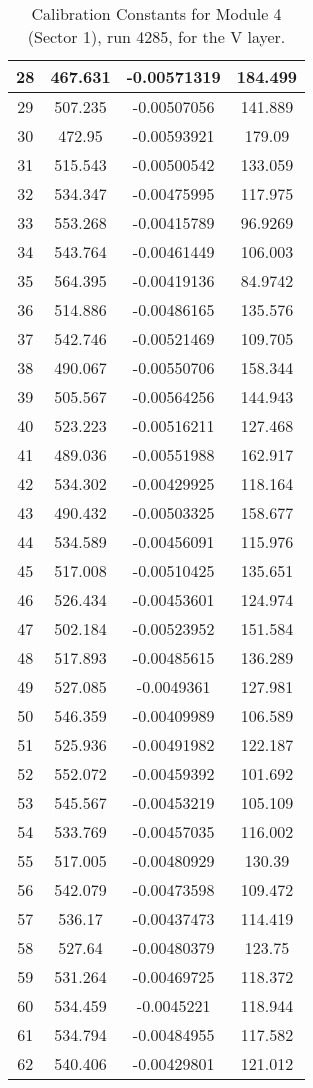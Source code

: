 \begin{table}[h]
{\begin{tabular}{|c|c|c|c|}
28	&	467.631	&	-0.00571319	&	184.499	\\	\hline
29	&	507.235	&	-0.00507056	&	141.889	\\	\hline
30	&	472.95	&	-0.00593921	&	179.09	\\	\hline
31	&	515.543	&	-0.00500542	&	133.059	\\	\hline
32	&	534.347	&	-0.00475995	&	117.975	\\	\hline
33	&	553.268	&	-0.00415789	&	96.9269	\\	\hline
34	&	543.764	&	-0.00461449	&	106.003	\\	\hline
35	&	564.395	&	-0.00419136	&	84.9742	\\	\hline
36	&	514.886	&	-0.00486165	&	135.576	\\	\hline
37	&	542.746	&	-0.00521469	&	109.705	\\	\hline
38	&	490.067	&	-0.00550706	&	158.344	\\	\hline
39	&	505.567	&	-0.00564256	&	144.943	\\	\hline
40	&	523.223	&	-0.00516211	&	127.468	\\	\hline
41	&	489.036	&	-0.00551988	&	162.917	\\	\hline
42	&	534.302	&	-0.00429925	&	118.164	\\	\hline
43	&	490.432	&	-0.00503325	&	158.677	\\	\hline
44	&	534.589	&	-0.00456091	&	115.976	\\	\hline
45	&	517.008	&	-0.00510425	&	135.651	\\	\hline
46	&	526.434	&	-0.00453601	&	124.974	\\	\hline
47	&	502.184	&	-0.00523952	&	151.584	\\	\hline
48	&	517.893	&	-0.00485615	&	136.289	\\	\hline
49	&	527.085	&	-0.0049361	&	127.981	\\	\hline
50	&	546.359	&	-0.00409989	&	106.589	\\	\hline
51	&	525.936	&	-0.00491982	&	122.187	\\	\hline
52	&	552.072	&	-0.00459392	&	101.692	\\	\hline
53	&	545.567	&	-0.00453219	&	105.109	\\	\hline
54	&	533.769	&	-0.00457035	&	116.002	\\	\hline
55	&	517.005	&	-0.00480929	&	130.39	\\	\hline
56	&	542.079	&	-0.00473598	&	109.472	\\	\hline
57	&	536.17	&	-0.00437473	&	114.419	\\	\hline
58	&	527.64	&	-0.00480379	&	123.75	\\	\hline
59	&	531.264	&	-0.00469725	&	118.372	\\	\hline
60	&	534.459	&	-0.0045221	&	118.944	\\	\hline
61	&	534.794	&	-0.00484955	&	117.582	\\	\hline
62	&	540.406	&	-0.00429801	&	121.012	\\	\hline
            \end{tabular}
        }
        \caption{Calibration Constants for Module 4 (Sector 1), run 4285, for the V layer.}
\end{table}


